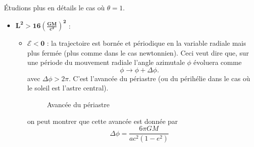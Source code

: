 \documentclass[a4paper,11pt]{report}
\begin{document}
            Étudions plus en détails le cas où $\theta=1$.
            \begin{itemize}[label = \textbullet]
                \item $\bm{L^2 > 16\left( \frac{GM}{c^2} \right)^2}$ : 
                \begin{itemize}[label = $\triangleright$]
                    \item $\bm{\mathscr{E}<0}$ : la trajectoire est bornée et périodique en la variable radiale mais plus fermée (plus comme dans le cas newtonnien). Ceci veut dire que, sur une période du mouvement radiale l'angle azimutale $\phi$ évoluera comme 
                    \begin{equation}
                        \phi\to\phi+\Delta\phi.
                    \end{equation}
                    avec $\Delta\phi > 2\pi$. C'est l'avancée du périastre (ou du périhélie dans le cas où le soleil est l'astre central).
                    
                    \begin{figure}[H]
                        \centering
                        \caption{Avancée du périastre}
                    \end{figure}
                    
                    on peut montrer que cette avancée est donnée par
                    \begin{equation}
                        \Delta \phi = \frac{6\pi GM}{ac^2(1-e^2)}
                    \end{equation}
                    

\end{itemize}
\end{itemize}
\end{document}
